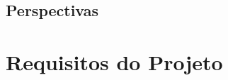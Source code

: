 \documentclass[ruledheader, 12pt, onecolumn, a4paper] {report}%
\begin{document}
\section{Perspectivas}


\chapter{Requisitos do Projeto}




\end{document}
